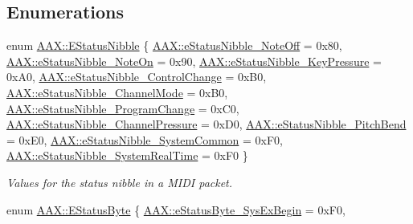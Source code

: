 \subsection*{Enumerations}
\begin{DoxyCompactItemize}
\item 
enum \mbox{\hyperlink{a00852_a128e460fdb72f04a5d077f77c02b3c30}{A\+A\+X\+::\+E\+Status\+Nibble}} \{ \newline
\mbox{\hyperlink{a00852_a128e460fdb72f04a5d077f77c02b3c30a879656d38da19be8e39951bb7037fdf6}{A\+A\+X\+::e\+Status\+Nibble\+\_\+\+Note\+Off}} = 0x80, 
\mbox{\hyperlink{a00852_a128e460fdb72f04a5d077f77c02b3c30ab269085f7106b0ba07ffaab0b7e6a713}{A\+A\+X\+::e\+Status\+Nibble\+\_\+\+Note\+On}} = 0x90, 
\mbox{\hyperlink{a00852_a128e460fdb72f04a5d077f77c02b3c30ac58c4a1d24d65b2aa83dd8958ab5c79f}{A\+A\+X\+::e\+Status\+Nibble\+\_\+\+Key\+Pressure}} = 0x\+A0, 
\mbox{\hyperlink{a00852_a128e460fdb72f04a5d077f77c02b3c30aad9f788bf727d8a2e29ed267f0c63c54}{A\+A\+X\+::e\+Status\+Nibble\+\_\+\+Control\+Change}} = 0x\+B0, 
\newline
\mbox{\hyperlink{a00852_a128e460fdb72f04a5d077f77c02b3c30acfa2f6c1f419ab8f84b18305cd182c05}{A\+A\+X\+::e\+Status\+Nibble\+\_\+\+Channel\+Mode}} = 0x\+B0, 
\mbox{\hyperlink{a00852_a128e460fdb72f04a5d077f77c02b3c30af1211ef53c1f40ee06aff0a624b42d2f}{A\+A\+X\+::e\+Status\+Nibble\+\_\+\+Program\+Change}} = 0x\+C0, 
\mbox{\hyperlink{a00852_a128e460fdb72f04a5d077f77c02b3c30a2f3c65a49b997078c50d7210a775f06c}{A\+A\+X\+::e\+Status\+Nibble\+\_\+\+Channel\+Pressure}} = 0x\+D0, 
\mbox{\hyperlink{a00852_a128e460fdb72f04a5d077f77c02b3c30a508ff1dbd19ad390f85611922fc81433}{A\+A\+X\+::e\+Status\+Nibble\+\_\+\+Pitch\+Bend}} = 0x\+E0, 
\newline
\mbox{\hyperlink{a00852_a128e460fdb72f04a5d077f77c02b3c30a046a282d622e11711878fcad5b713c8d}{A\+A\+X\+::e\+Status\+Nibble\+\_\+\+System\+Common}} = 0x\+F0, 
\mbox{\hyperlink{a00852_a128e460fdb72f04a5d077f77c02b3c30ab036cdb470fde61d5a397be9a1b036a5}{A\+A\+X\+::e\+Status\+Nibble\+\_\+\+System\+Real\+Time}} = 0x\+F0
 \}
\begin{DoxyCompactList}\small\item\em Values for the status nibble in a M\+I\+DI packet. \end{DoxyCompactList}\item 
enum \mbox{\hyperlink{a00852_a007db6cfa461dbbb87e49e2ec52e18b0}{A\+A\+X\+::\+E\+Status\+Byte}} \{ \newline
\mbox{\hyperlink{a00852_a007db6cfa461dbbb87e49e2ec52e18b0afe46f6c375435e0cddbcb9efda89b9ca}{A\+A\+X\+::e\+Status\+Byte\+\_\+\+Sys\+Ex\+Begin}} = 0x\+F0, 

\end{DoxyCompactItemize}
